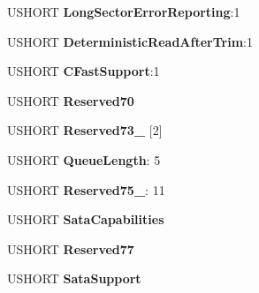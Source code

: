 \begin{DoxyCompactItemize}
U\+S\+H\+O\+RT {\bfseries Long\+Sector\+Error\+Reporting}\+:1
\item 
\mbox{\label{struct___i_d_e_n_t_i_f_y___d_a_t_a_ae66ff32350ca2a9a7c9976303071d6e8}} 
U\+S\+H\+O\+RT {\bfseries Deterministic\+Read\+After\+Trim}\+:1
\item 
\mbox{\label{struct___i_d_e_n_t_i_f_y___d_a_t_a_a009cf0753540f217330f5e692bee03f4}} 
U\+S\+H\+O\+RT {\bfseries C\+Fast\+Support}\+:1
\item 
\mbox{\label{struct___i_d_e_n_t_i_f_y___d_a_t_a_aafeac00fa3acc405dbf8b3ebbc46eff6}} 
U\+S\+H\+O\+RT {\bfseries Reserved70}
\item 
\mbox{\label{struct___i_d_e_n_t_i_f_y___d_a_t_a_abd1d19ecd1d31c52cf2911871cdb38ee}} 
U\+S\+H\+O\+RT {\bfseries Reserved73\+\_} \mbox{[}2\mbox{]}
\item 
\mbox{\label{struct___i_d_e_n_t_i_f_y___d_a_t_a_a02ac92733258e3af2eb4da96262f99eb}} 
U\+S\+H\+O\+RT {\bfseries Queue\+Length}\+: 5
\item 
\mbox{\label{struct___i_d_e_n_t_i_f_y___d_a_t_a_abff4b1f6593b3d1a73a5c1a37b7b563c}} 
U\+S\+H\+O\+RT {\bfseries Reserved75\+\_}\+: 11
\item 
\mbox{\label{struct___i_d_e_n_t_i_f_y___d_a_t_a_a7d2ae5eeb3c8bc29a9bb0eca43776fcc}} 
U\+S\+H\+O\+RT {\bfseries Sata\+Capabilities}
\item 
\mbox{\label{struct___i_d_e_n_t_i_f_y___d_a_t_a_ad45932f9761dfca0882ecd1f1bcbe843}} 
U\+S\+H\+O\+RT {\bfseries Reserved77}
\item 
\mbox{\label{struct___i_d_e_n_t_i_f_y___d_a_t_a_a2ee1d722ed109b94ffbbe84e9b5a976c}} 
U\+S\+H\+O\+RT {\bfseries Sata\+Support}
\item 
\mbox{\label{struct___i_d_e_n_t_i_f_y___d_a_t_a_a3cd79fd4dcb510e2140af6b5df2aeebf}} 

\end{DoxyCompactItemize}
